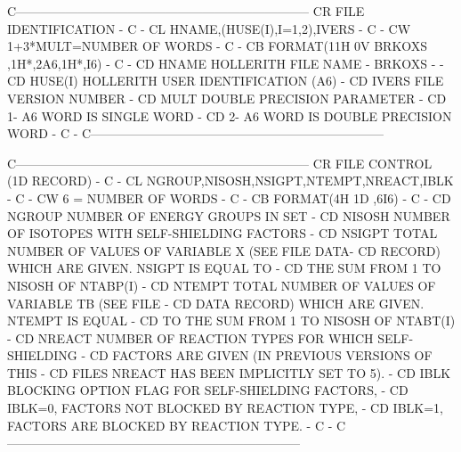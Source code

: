 \begin{ccode}
C-----------------------------------------------------------------------
CR          FILE IDENTIFICATION                                        -
C                                                                      -
CL    HNAME,(HUSE(I),I=1,2),IVERS                                      -
C                                                                      -
CW    1+3*MULT=NUMBER OF WORDS                                         -
C                                                                      -
CB    FORMAT(11H 0V BRKOXS  ,1H*,2A6,1H*,I6)                           -
C                                                                      -
CD    HNAME       HOLLERITH FILE NAME - BRKOXS -                       -
CD    HUSE(I)     HOLLERITH USER IDENTIFICATION (A6)                   -
CD    IVERS       FILE VERSION NUMBER                                  -
CD    MULT        DOUBLE PRECISION PARAMETER                           -
CD                    1- A6 WORD IS SINGLE WORD                        -
CD                    2- A6 WORD IS DOUBLE PRECISION WORD              -
C                                                                      -
C-----------------------------------------------------------------------

C-----------------------------------------------------------------------
CR          FILE CONTROL   (1D RECORD)                                 -
C                                                                      -
CL    NGROUP,NISOSH,NSIGPT,NTEMPT,NREACT,IBLK                          -
C                                                                      -
CW    6 = NUMBER OF WORDS                                              -
C                                                                      -
CB    FORMAT(4H 1D ,6I6)                                               -
C                                                                      -
CD    NGROUP        NUMBER OF ENERGY GROUPS IN SET                     -
CD    NISOSH        NUMBER OF ISOTOPES WITH SELF-SHIELDING FACTORS     -
CD    NSIGPT        TOTAL NUMBER OF VALUES OF VARIABLE X (SEE FILE DATA-
CD                     RECORD) WHICH ARE GIVEN.  NSIGPT IS EQUAL TO    -
CD                     THE SUM FROM 1 TO NISOSH OF NTABP(I)            -
CD    NTEMPT        TOTAL NUMBER OF VALUES OF VARIABLE TB (SEE FILE    -
CD                     DATA RECORD) WHICH ARE GIVEN.  NTEMPT IS EQUAL  -
CD                     TO THE SUM FROM 1 TO NISOSH OF NTABT(I)         -
CD    NREACT        NUMBER OF REACTION TYPES FOR WHICH SELF-SHIELDING  -
CD                     FACTORS ARE GIVEN (IN PREVIOUS VERSIONS OF THIS -
CD                     FILES NREACT HAS BEEN IMPLICITLY SET TO 5).     -
CD    IBLK          BLOCKING OPTION FLAG FOR SELF-SHIELDING FACTORS,   -
CD                     IBLK=0, FACTORS NOT BLOCKED BY REACTION TYPE,   -
CD                     IBLK=1, FACTORS ARE BLOCKED BY REACTION TYPE.   -
C                                                                      -
C-----------------------------------------------------------------------


\end{ccode}
